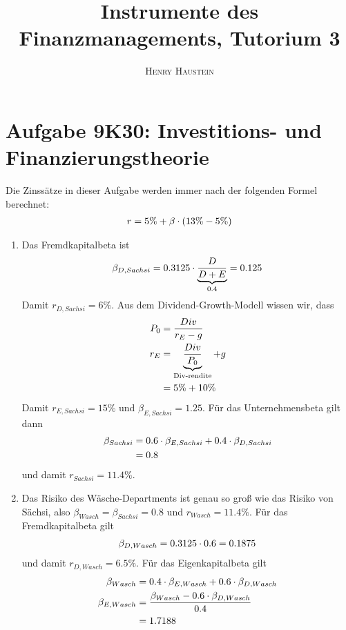 \documentclass{article}
\title{\textbf{Instrumente des Finanzmanagements, Tutorium 3}}
\author{\textsc{Henry Haustein}}
\date{}
\begin{document}
	\maketitle
	
	\section*{Aufgabe 9K30: Investitions- und Finanzierungstheorie}
	Die Zinssätze in dieser Aufgabe werden immer nach der folgenden Formel berechnet:
	\begin{align}
		r = 5\% + \beta\cdot (13\% - 5\%) \notag
	\end{align}
	\begin{enumerate}[label=(\alph*)]
		\item Das Fremdkapitalbeta ist
		\begin{align}
			\beta_{D,Sachsi} = 0.3125\cdot \underbrace{\frac{D}{D+E}}_{0.4} = 0.125 \notag
		\end{align}
		Damit $r_{D,Sachsi} = 6\%$. Aus dem Dividend-Growth-Modell wissen wir, dass
		\begin{align}
			P_0 &= \frac{Div}{r_E-g} \notag \\
			r_E &= \underbrace{\frac{Div}{P_0}}_{\text{Div-rendite}} + g \notag \\
			&= 5\% + 10\% \notag
		\end{align}
		Damit $r_{E,Sachsi}=15\%$ und $\beta_{E,Sachsi}=1.25$. Für das Unternehmensbeta gilt dann
		\begin{align}
			\beta_{Sachsi} &= 0.6\cdot\beta_{E,Sachsi} + 0.4\cdot\beta_{D,Sachsi} \notag \\
			&= 0.8 \notag
		\end{align}
		und damit $r_{Sachsi}=11.4\%$.
		\item Das Risiko des Wäsche-Departments ist genau so groß wie das Risiko von Sächsi, also $\beta_{Wasch} = \beta_{Sachsi} = 0.8$ und $r_{Wasch}=11.4\%$. Für das Fremdkapitalbeta gilt
		\begin{align}
			\beta_{D,Wasch} = 0.3125\cdot 0.6=0.1875\notag
		\end{align}
		und damit $r_{D,Wasch}=6.5\%$. Für das Eigenkapitalbeta gilt
		\begin{align}
			\beta_{Wasch} &= 0.4\cdot\beta_{E,Wasch} + 0.6\cdot\beta_{D,Wasch} \notag \\
			\beta_{E,Wasch} &= \frac{\beta_{Wasch} - 0.6\cdot\beta_{D,Wasch}}{0.4} \notag \\
			&= 1.7188 \notag
		\end{align}

\end{enumerate}
\end{document}
